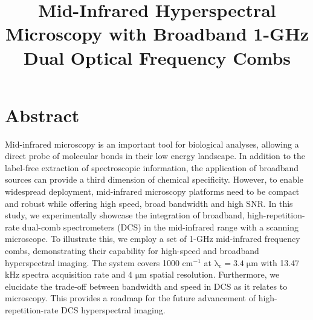 \documentclass{optica-article}
\begin{document}
\title{Mid-Infrared Hyperspectral Microscopy with Broadband 1-GHz Dual Optical Frequency Combs}

\section{Abstract}

Mid-infrared microscopy is an important tool for biological analyses, allowing a direct probe of molecular bonds in their low energy landscape. In addition to the label-free extraction of spectroscopic information, the application of broadband sources can provide a third dimension of chemical specificity. However, to enable widespread deployment, mid-infrared microscopy platforms need to be compact and robust while offering high speed, broad bandwidth and high SNR. In this study, we experimentally showcase the integration of broadband, high-repetition-rate dual-comb spectrometers (DCS) in the mid-infrared range with a scanning microscope. To illustrate this, we employ a set of 1-GHz mid-infrared frequency combs, demonstrating their capability for high-speed and broadband hyperspectral imaging. The system covers 1000 $\mathrm{cm^{-1}}$ at $\mathrm{\lambda_c=3.4 \; \mu m}$ with 13.47 kHz spectra acquisition rate and 4 $\mathrm{\mu m}$ spatial resolution. Furthermore, we elucidate the trade-off between bandwidth and speed in DCS as it relates to microscopy. This provides a roadmap for the future advancement of high-repetition-rate DCS hyperspectral imaging.

\end{document}
